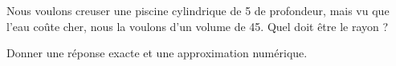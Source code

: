 
\begin{exercice}\label{exosmath-0253}

    Nous voulons creuser une piscine cylindrique de \unit{5}{\meter} de profondeur, mais vu que l'eau coûte cher, nous la voulons d'un volume de \unit{45}{\cubic\meter}. Quel doit être le rayon ?

    Donner une réponse exacte et une approximation numérique.

\end{exercice}
